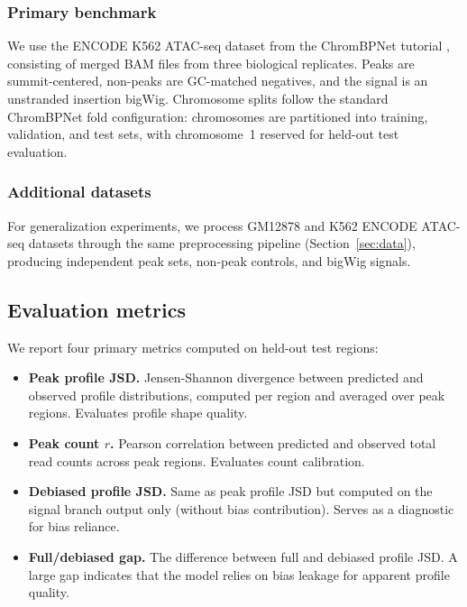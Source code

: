 \documentclass[11pt,a4paper]{article}
\begin{document}
\subsubsection{Primary benchmark}

We use the ENCODE K562 ATAC-seq dataset from the ChromBPNet tutorial
\cite{pampari2023chrombpnet}, consisting of merged BAM files from
three biological replicates. Peaks are summit-centered, non-peaks are
GC-matched negatives, and the signal is an unstranded insertion bigWig.
Chromosome splits follow the standard ChromBPNet fold configuration:
chromosomes are partitioned into training, validation, and test sets,
with chromosome~1 reserved for held-out test evaluation.

\subsubsection{Additional datasets}

For generalization experiments, we process GM12878 and K562 ENCODE
ATAC-seq datasets through the same preprocessing pipeline
(Section~\ref{sec:data}), producing independent peak sets, non-peak
controls, and bigWig signals.

\subsection{Evaluation metrics}
\label{sec:metrics}

We report four primary metrics computed on held-out test regions:

\begin{itemize}[leftmargin=2em]
  \item \textbf{Peak profile JSD.} Jensen-Shannon divergence between
  predicted and observed profile distributions, computed per region and
  averaged over peak regions. Evaluates profile shape quality.

  \item \textbf{Peak count $r$.} Pearson correlation between predicted
  and observed total read counts across peak regions. Evaluates count
  calibration.

  \item \textbf{Debiased profile JSD.} Same as peak profile JSD but
  computed on the signal branch output only (without bias contribution).
  Serves as a diagnostic for bias reliance.

  \item \textbf{Full/debiased gap.} The difference between full and
  debiased profile JSD. A large gap indicates that the model relies
  on bias leakage for apparent profile quality.
\end{itemize}
\end{document}
